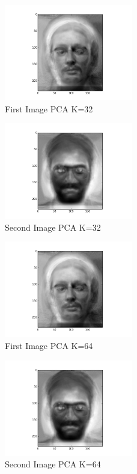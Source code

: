 \documentclass[conference]{IEEEtran}
\begin{document}
    \begin{figure}[htbp]
        \centerline{\includegraphics[width=0.5\textwidth]{pca32-1.png}}
        \caption{First Image PCA K=32}
    \end{figure}

    \begin{figure}[htbp]
        \centerline{\includegraphics[width=0.5\textwidth]{pca32-2.png}}
        \caption{Second Image PCA K=32}
    \end{figure}

    \begin{figure}[htbp]
        \centerline{\includegraphics[width=0.5\textwidth]{pca64-1.png}}
        \caption{First Image PCA K=64}
    \end{figure}

    \begin{figure}[htbp]
        \centerline{\includegraphics[width=0.5\textwidth]{pca64-2.png}}
        \caption{Second Image PCA K=64}
    \end{figure}
\end{document}
